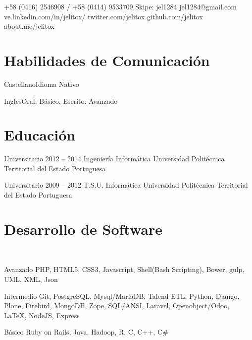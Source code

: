 \documentclass{tccv}
\begin{document}
    {+58 (0416) 2546908 / +58 (0414) 9533709}
    {Skipe: jel1284}
    {jel1284@gmail.com}
    {ve.linkedin.com/in/jelitox/}
    {twitter.com/jelitox}
    {github.com/jelitox}
    {about.me/jelitox}

\section{Habilidades de Comunicaci\'on}

\begin{idiomas}
\item{Castellano}{Idioma Nativo}
\item{Ingles}{Oral: B\'asico, Escrito: Avanzado}
\end{idiomas}
\section{Educaci\'on}

\begin{estudios}

\item[Universitario]{2012 -- 2014}
     {Ingenier\'ia Inform\'atica}
     {Universidad Polit\'ecnica Territorial del Estado Portuguesa}

\item[Universitario]{2009 -- 2012}
     {T.S.U. Inform\'atica}
     {Universidad Polit\'ecnica Territorial del Estado Portuguesa}

\end{estudios}

\section{Desarrollo de Software }

\begin{software}
\\
\item{Avanzado}
     {PHP, HTML5, CSS3, Javascript, Shell(Bash Scripting), Bower, gulp, UML, XML, Json} \\
\item{Intermedio}
     {Git, PostgreSQL, Mysql/MariaDB, Talend ETL, Python, Django, Plone, Firebird, MongoDB, Zope, SQL/ANSI, Laravel, Openobject/Odoo, \LaTeX, NodeJS, Express } \\
\item{B\'asico}
     {Ruby on Rails, Java, Hadoop, R, C, C++, C\#} \\

\end{software}
\end{document}
